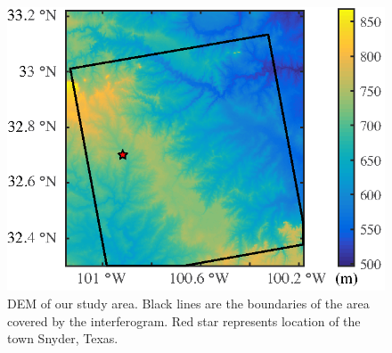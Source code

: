 \clearpage
\begin{figure}
	\centering
	\includegraphics{figs_paper3/Fig3.eps}	
	\caption{DEM of our study area.  Black lines are the boundaries of the area covered by the interferogram.  Red star represents location of the town Snyder, Texas.}
	\label{fig:dem}
\end{figure}


